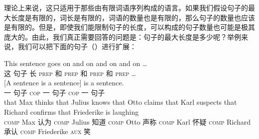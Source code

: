 理论上来说，这只适用于那些由有限词语序列构成的语言。如果我们假设句子的最大长度是有限的，词长是有限的，词语的数量也是有限的，那么句子的数量也应该是有限的。但是，即使我们能限制句子的长度，可以构成的句子数量也可能是极其庞大的。由此，我们真正需要回答的问题是：句子的最大长度是多少呢？举例来说，我们可以把下面的句子（）进行扩展：

\eal 
\ex 
\gll This sentence goes on and on and on and on \ldots \\
       这 句子 长 \textsc{prep} 和 \textsc{prep} 和 \textsc{prep} 和 \textsc{prep} \ldots \\
\ex
\gll  {}[A sentence is a sentence] is a sentence. \\
      {}一 句子 \textsc{cop} 一 句子 \textsc{cop} 一 句子\\
\ex\label{einbettung-dass-Saetze}
\gll that Max thinks that Julius knows that Otto claims that Karl suspects that Richard confirms that Friederike is laughing\\
      \textsc{comp} Max 认为 \textsc{comp} Julius 知道 \textsc{comp} Otto 声称 \textsc{comp} Karl 怀疑 \textsc{comp} Richard 承认 \textsc{comp} Friederike \textsc{aux} 笑\\
\zl

